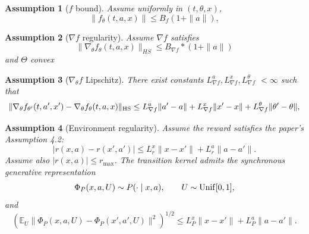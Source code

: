 \documentclass{article}
\newtheorem{ass}{Assumption}
\theoremstyle{definition}
\theoremstyle{remark}
\theoremstyle{mystyle}
\newcommand{\1}{\mathbbm{1}}
\begin{document}
\begin{ass}[$f$ bound]
Assume uniformly in \((t,\theta,x)\),
\[
\|f_\theta(t,a,x)\|
\le B_f(1+\|a\|),
\]
\end{ass}
\begin{ass}[$\nabla f$ regularity]
Assume $\nabla f$ satisfies
\[
\|\nabla_\theta f_\theta(t,a,x)\|_{HS}\leq B_{\nabla f}*(1+\|a\|)
\]
and $\Theta$ convex
\end{ass}
\begin{ass}[$\nabla_\theta f$ Lipschitz]
There exist constants \(L_{\nabla f}^a,L_{\nabla f}^x,L_{\nabla f}^\theta\) $<\infty$ such that
\[
\|\nabla_\theta f_{\theta'}(t,a',x')-\nabla_\theta f_\theta(t,a,x)\|_{\rm HS}
\le
L_{\nabla f}^a\|a'-a\|
+
L_{\nabla f}^x\|x'-x\|
+
L_{\nabla f}^\theta\|\theta'-\theta\|,
\]
\end{ass}




\begin{ass}[Environment regularity]
Assume the reward satisfies the paper's Assumption 4.2:
\[
|r(x,a)-r(x',a')|
\le
L_r^x\|x-x'\|+L_r^a\|a-a'\|.
\]
Assume also \(|r(x,a)|\le r_{\max}\). The transition kernel admits the synchronous generative representation
\[
\Phi_P(x,a,U)\sim P(\cdot\mid x,a),
\qquad
U\sim{\rm Unif}[0,1],
\]
and
\[
\left(
\mathbb E_U
\|\Phi_P(x,a,U)-\Phi_P(x',a',U)\|^2
\right)^{1/2}
\le
L_P^x\|x-x'\|+L_P^a\|a-a'\|.
\tag{E}
\]
\end{ass}
\end{document}
